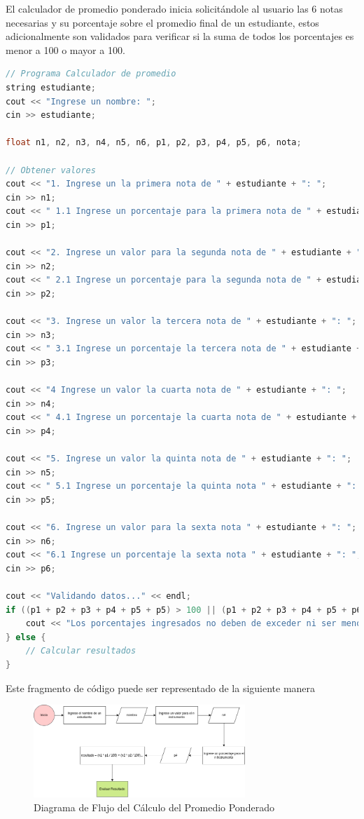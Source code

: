 \documentclass{article}
\begin{document}
El calculador de promedio ponderado inicia solicitándole al usuario las 6 notas necesarias y su porcentaje sobre el promedio final de un estudiante, estos adicionalmente son validados para verificar si la suma de todos los porcentajes es menor a 100 o mayor a 100.

\begin{lstlisting}[style=mystyle, language=c++]
// Programa Calculador de promedio
string estudiante;
cout << "Ingrese un nombre: ";
cin >> estudiante;

float n1, n2, n3, n4, n5, n6, p1, p2, p3, p4, p5, p6, nota;

// Obtener valores
cout << "1. Ingrese un la primera nota de " + estudiante + ": ";
cin >> n1;
cout << " 1.1 Ingrese un porcentaje para la primera nota de " + estudiante + ": ";
cin >> p1;

cout << "2. Ingrese un valor para la segunda nota de " + estudiante + ": ";
cin >> n2;
cout << " 2.1 Ingrese un porcentaje para la segunda nota de " + estudiante + ": ";
cin >> p2;

cout << "3. Ingrese un valor la tercera nota de " + estudiante + ": ";
cin >> n3;
cout << " 3.1 Ingrese un porcentaje la tercera nota de " + estudiante + ": ";
cin >> p3;

cout << "4 Ingrese un valor la cuarta nota de " + estudiante + ": ";
cin >> n4;
cout << " 4.1 Ingrese un porcentaje la cuarta nota de " + estudiante + ": ";
cin >> p4;

cout << "5. Ingrese un valor la quinta nota de " + estudiante + ": ";
cin >> n5;
cout << " 5.1 Ingrese un porcentaje la quinta nota " + estudiante + ": ";
cin >> p5;

cout << "6. Ingrese un valor para la sexta nota " + estudiante + ": ";
cin >> n6;
cout << "6.1 Ingrese un porcentaje la sexta nota " + estudiante + ": ";
cin >> p6;

cout << "Validando datos..." << endl;
if ((p1 + p2 + p3 + p4 + p5 + p5) > 100 || (p1 + p2 + p3 + p4 + p5 + p6) < 100 ) {
    cout << "Los porcentajes ingresados no deben de exceder ni ser menor a un 100% ..." << endl;
} else {
    // Calcular resultados
}
\end{lstlisting}

Este fragmento de código puede ser representado de la siguiente manera

\begin{figure}[H]
    \centering
    \includegraphics[width=8cm]{promedio_ponderado_calcular_resultado}
    \caption{Diagrama de Flujo del Cálculo del Promedio Ponderado}
\end{figure}
\end{document}
